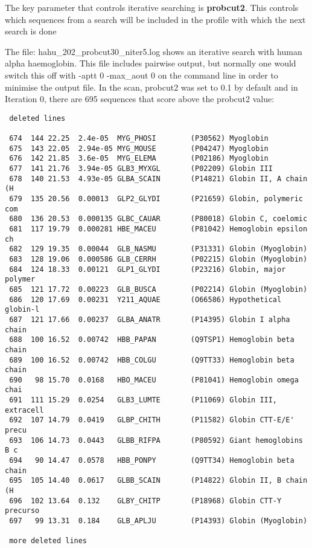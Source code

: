 \documentclass[12pt]{article}
\begin{document}
The key parameter that controls iterative searching is {\bf probcut2}.
This controls which sequences from a search will be included in the
profile with which the next search is done


The file: hahu\_202\_probcut30\_niter5.log shows an iterative search
with human alpha haemoglobin.  This file includes pairwise output, but
normally one would switch this off with -aptt 0 -max\_aout 0 on the
command line in order to minimise the output file.  In the scan,
probcut2 was set to 0.1 by default and in Iteration 0, there are 695
sequences that score above the probcut2 value:

\begin{scriptsize}
\begin{verbatim}
 deleted lines

 674  144 22.25  2.4e-05  MYG_PHOSI        (P30562) Myoglobin            
 675  143 22.05  2.94e-05 MYG_MOUSE        (P04247) Myoglobin            
 676  142 21.85  3.6e-05  MYG_ELEMA        (P02186) Myoglobin            
 677  141 21.76  3.94e-05 GLB3_MYXGL       (P02209) Globin III           
 678  140 21.53  4.93e-05 GLBA_SCAIN       (P14821) Globin II, A chain (H
 679  135 20.56  0.00013  GLP2_GLYDI       (P21659) Globin, polymeric com
 680  136 20.53  0.000135 GLBC_CAUAR       (P80018) Globin C, coelomic   
 681  117 19.79  0.000281 HBE_MACEU        (P81042) Hemoglobin epsilon ch
 682  129 19.35  0.00044  GLB_NASMU        (P31331) Globin (Myoglobin)   
 683  128 19.06  0.000586 GLB_CERRH        (P02215) Globin (Myoglobin)   
 684  124 18.33  0.00121  GLP1_GLYDI       (P23216) Globin, major polymer
 685  121 17.72  0.00223  GLB_BUSCA        (P02214) Globin (Myoglobin)   
 686  120 17.69  0.00231  Y211_AQUAE       (O66586) Hypothetical globin-l
 687  121 17.66  0.00237  GLBA_ANATR       (P14395) Globin I alpha chain 
 688  100 16.52  0.00742  HBB_PAPAN        (Q9TSP1) Hemoglobin beta chain
 689  100 16.52  0.00742  HBB_COLGU        (Q9TT33) Hemoglobin beta chain
 690   98 15.70  0.0168   HBO_MACEU        (P81041) Hemoglobin omega chai
 691  111 15.29  0.0254   GLB3_LUMTE       (P11069) Globin III, extracell
 692  107 14.79  0.0419   GLBP_CHITH       (P11582) Globin CTT-E/E' precu
 693  106 14.73  0.0443   GLBB_RIFPA       (P80592) Giant hemoglobins B c
 694   90 14.47  0.0578   HBB_PONPY        (Q9TT34) Hemoglobin beta chain
 695  105 14.40  0.0617   GLBB_SCAIN       (P14822) Globin II, B chain (H
 696  102 13.64  0.132    GLBY_CHITP       (P18968) Globin CTT-Y precurso
 697   99 13.31  0.184    GLB_APLJU        (P14393) Globin (Myoglobin)   

 more deleted lines
\end{verbatim}
\end{scriptsize}
\end{document}
